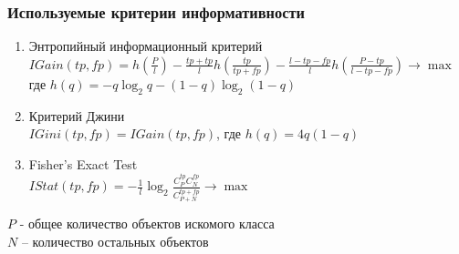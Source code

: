 \documentclass[12pt]{beamer}
\begin{document}
\begin{frame}\frametitle{Используемые критерии информативности}
\begin{enumerate}[--]
\item Энтропийный информационный критерий\\
$IGain(tp,fp) = h(\frac{P}{l}) - \frac{tp+tp}{l}h(\frac{tp}{tp+fp}) - \frac{l-tp-fp}{l}h(\frac{P-tp}{l-tp-fp}) \rightarrow \max$\\
где $h(q) = -q\log_2q - (1-q)\log_2(1-q)$
\item Критерий Джини\\
$IGini(tp,fp)=IGain(tp,fp)$, где $h(q)=4q(1-q)$
\item Fisher’s Exact Test\\
$IStat(tp,fp) = -\frac{1}{l}\log_2\frac{C_P^{tp}C_N^{fp}}{C_{P+N}^{tp+fp}} \rightarrow \max$

\end{enumerate}
\vspace{5mm}
$P$ - общее количество объектов искомого класса\\
 $N$ -- количество остальных объектов
\end{frame}

\end{document}

